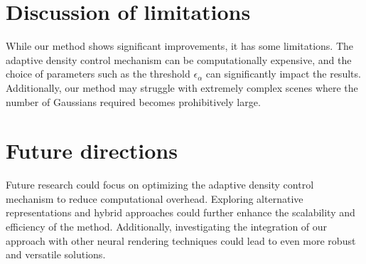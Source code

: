 \documentclass[11pt]{report}
\begin{document}
\section{Discussion of limitations}
While our method shows significant improvements, it has some limitations. The adaptive density control mechanism can be computationally expensive, and the choice of parameters such as the threshold $\epsilon_\alpha$ can significantly impact the results. Additionally, our method may struggle with extremely complex scenes where the number of Gaussians required becomes prohibitively large.

\section{Future directions}
Future research could focus on optimizing the adaptive density control mechanism to reduce computational overhead. Exploring alternative representations and hybrid approaches could further enhance the scalability and efficiency of the method. Additionally, investigating the integration of our approach with other neural rendering techniques could lead to even more robust and versatile solutions.
\end{document}
